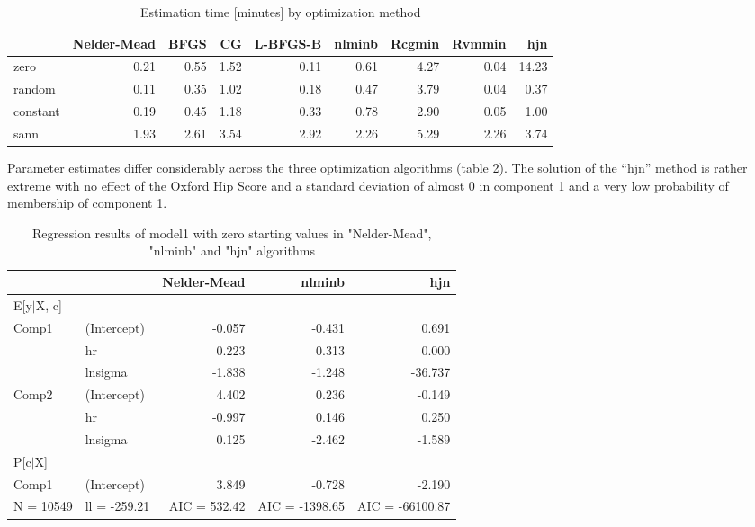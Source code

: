 \documentclass[
]{article}
\begin{document}
\begin{table}[ht]
\centering
\caption{Estimation time [minutes] by optimization method} 
\label{tab:time}
\begin{tabular}{lrrrrrrrr}
  \hline
 & Nelder-Mead & BFGS & CG & L-BFGS-B & nlminb & Rcgmin & Rvmmin & hjn \\ 
  \hline
zero & 0.21 & 0.55 & 1.52 & 0.11 & 0.61 & 4.27 & 0.04 & 14.23 \\ 
  random & 0.11 & 0.35 & 1.02 & 0.18 & 0.47 & 3.79 & 0.04 & 0.37 \\ 
  constant & 0.19 & 0.45 & 1.18 & 0.33 & 0.78 & 2.90 & 0.05 & 1.00 \\ 
  sann & 1.93 & 2.61 & 3.54 & 2.92 & 2.26 & 5.29 & 2.26 & 3.74 \\ 
   \hline
\end{tabular}
\end{table}

Parameter estimates differ considerably across the three optimization algorithms (table \ref{tab:tab-comp-coef}). The solution of the ``hjn'' method is rather extreme with no effect of the Oxford Hip Score and a standard deviation of almost 0 in component 1 and a very low probability of membership of component 1.

\begin{table}[ht]
\centering
\caption{Regression results of model1 with zero starting 
                     values in "Nelder-Mead", "nlminb" and "hjn" algorithms} 
\label{tab:tab-comp-coef}
\begin{tabular}{llrrr}
  \hline
 &  & Nelder-Mead & nlminb & hjn \\ 
  \hline
E[y$|$X, c] &  &  &  &  \\ 
   \hline
Comp1 & (Intercept) & -0.057 & -0.431 & 0.691 \\ 
   & hr &  0.223 &  0.313 & 0.000 \\ 
   & lnsigma & -1.838 & -1.248 & -36.737 \\ 
  Comp2 & (Intercept) &  4.402 & 0.236 & -0.149 \\ 
   & hr & -0.997 & 0.146 &  0.250 \\ 
   & lnsigma & 0.125 & -2.462 & -1.589 \\ 
   \hline
P[c$|$X] &  &  &  &  \\ 
   \hline
Comp1 & (Intercept) & 3.849 & -0.728 & -2.190 \\ 
   \hline
N = 10549 & ll = -259.21 & AIC = 532.42 & AIC = -1398.65 & AIC = -66100.87 \\ 
  \end{tabular}
\end{table}
\end{document}
